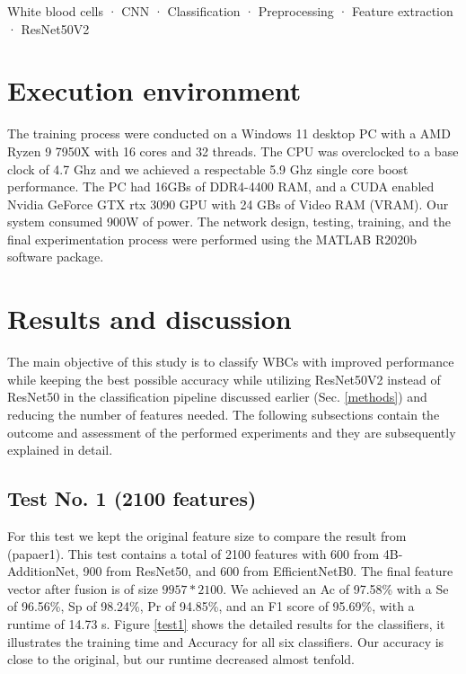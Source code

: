 \documentclass[conference]{IEEEtran}
\begin{document}
\begin{IEEEkeywords}
White blood cells · CNN · Classification · Preprocessing · Feature extraction · ResNet50V2
\end{IEEEkeywords}






\section{Execution environment}
The training process were conducted on a Windows 11 desktop PC with a AMD Ryzen 9 7950X with 16 cores and 32 threads. The CPU was overclocked to a base clock of 4.7 Ghz and we achieved a respectable 5.9 Ghz single core boost performance. The PC had 16GBs of DDR4-4400 RAM, and a CUDA enabled Nvidia GeForce GTX rtx 3090 GPU with 24 GBs of Video RAM (VRAM). Our system consumed 900W of power. The network design, testing, training, and the final experimentation process were performed using the MATLAB R2020b software package.
\section{Results and discussion}

The main objective of this study is to classify WBCs with improved performance while keeping the best possible accuracy while utilizing ResNet50V2 instead of ResNet50 in the classification pipeline discussed earlier (Sec. \ref{methods}) and reducing the number of features needed.
The following subsections contain the outcome and assessment of the performed experiments and they are subsequently explained in detail.

\subsection{Test No. 1 (2100 features)}
For this test we kept the original feature size to compare the result from (papaer1).
This test contains a total of 2100 features with 600 from 4B-AdditionNet, 900 from ResNet50, and 600 from EfficientNetB0. 
The final feature vector after fusion is of size $9957*2100$.
We achieved an Ac of 97.58\% with a Se of 96.56\%, Sp of 98.24\%, Pr of 94.85\%, and an F1 score of 95.69\%, with a runtime of 14.73 s. 
Figure \ref{test1} shows the detailed results for the classifiers, it illustrates the training time and Accuracy for all six classifiers.
Our accuracy is close to the original, but our runtime decreased almost tenfold.
\end{document}
